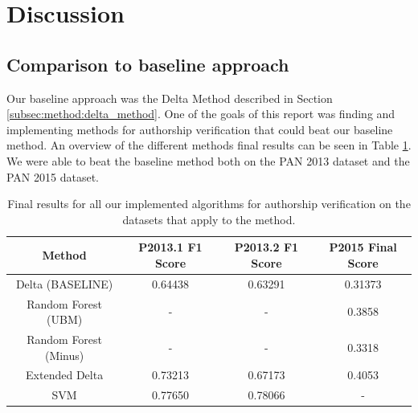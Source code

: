 \section{Discussion} \label{sec:discussion}

\subsection{Comparison to baseline approach}
Our baseline approach was the Delta Method described in Section
\ref{subsec:method:delta_method}. One of the goals of this report was finding
and implementing methods for authorship verification that could beat our
baseline method. An overview of the different methods final results can be seen
in Table \ref{tab:all_final_results}. We were able to beat
the baseline method both on the PAN 2013 dataset and the PAN 2015 dataset.


\begin{table}
    \centering
    \begin{tabular}{|c|c|c|c|}
    \hline
    \textbf{Method}             & \textbf{P2013.1 F1 Score} & \textbf{P2013.2 F1 Score} & \textbf{P2015 Final Score} \\ \hline
    Delta (BASELINE)            & 0.64438                      & 0.63291                      & 0.31373                        \\ \hline
    Random Forest (\gls{UBM}) & -                            & -                            & 0.3858                        \\ \hline
    Random Forest (Minus)       & -                            & -                            & 0.3318                        \\ \hline
    Extended Delta              & 0.73213                      & 0.67173                      & 0.4053                        \\ \hline
    SVM                         & 0.77650                      & 0.78066                      & -                             \\ \hline
    \end{tabular}
    \caption{Final results for all our implemented algorithms for authorship
    verification on the datasets that apply to the method.}
    \label{tab:all_final_results}
\end{table}

